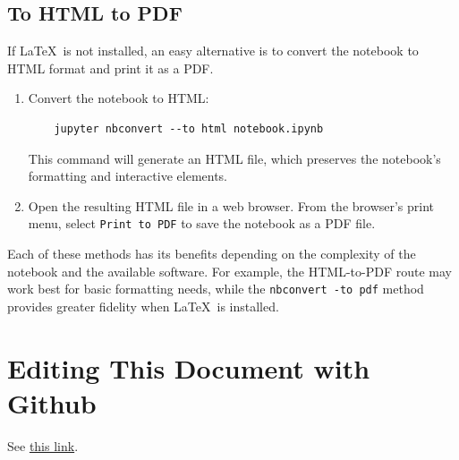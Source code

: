 \documentclass{article}
\begin{document}
\subsection{To HTML to PDF}

If \LaTeX~is not installed, an easy alternative is to convert the notebook to HTML format and print it as a PDF.

\begin{enumerate}
    \item Convert the notebook to HTML:
    \begin{verbatim}
    jupyter nbconvert --to html notebook.ipynb
    \end{verbatim}
    This command will generate an HTML file, which preserves the notebook’s formatting and interactive elements.
    
    \item Open the resulting HTML file in a web browser. From the browser’s print menu, select \texttt{Print to PDF} to save the notebook as a PDF file.
\end{enumerate}

Each of these methods has its benefits depending on the complexity of the notebook and the available software. For example, the HTML-to-PDF route may work best for basic formatting needs, while the \texttt{nbconvert -to pdf} method provides greater fidelity when \LaTeX~is installed.

\section{Editing This Document with Github}

See \href{https://www.zonca.dev/posts/2023-02-02-github-overleaf#:~:text=Create%20a%20new%20repository%20on,this%20repository%20under%20your%20account.}{this link}.
\end{document}
